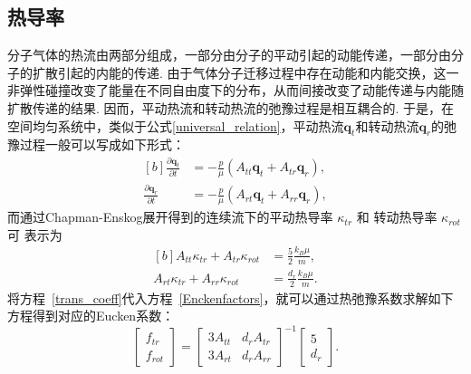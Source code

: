 \subsection{热导率} 

分子气体的热流由两部分组成，一部分由分子的平动引起的动能传递，一部分由分子的扩散引起的内能的传递. 由于气体分子迁移过程中存在动能和内能交换，这一非弹性碰撞改变了能量在不同自由度下的分布，从而间接改变了动能传递与内能随扩散传递的结果. 因而，平动热流和转动热流的弛豫过程是相互耦合的.  于是，在空间均匀系统中，类似于公式\eqref{universal_relation}，平动热流$\bm{q}_{t}$和转动热流$\bm{q}_{r}$的弛豫过程一般可以写成如下形式：
\begin{equation}\label{relax_flux}
\begin{aligned}[b]
\frac{\partial\bm{q}_{t}}{\partial{t}}&=-\frac{p}{\mu}( A_{tt}\bm{q}_{t}+A_{tr}\bm{q}_{r}),\\
\frac{\partial\bm{q}_{r}}{\partial{t}}&=-\frac{p}{\mu}( A_{rt}\bm{q}_{t}+A_{rr}\bm{q}_{r}),
\end{aligned}
\end{equation}
而通过Chapman-Enskog展开得到的连续流下的平动热导率 $\kappa_{tr}$ 和 转动热导率 $\kappa_{rot}$ 可 表示为
\begin{equation}\label{trans_coeff}
\begin{aligned}[b]
A_{tt}\kappa_{tr}+A_{tr}\kappa_{rot}&=\frac{5}{2}\frac{k_B\mu}{m},\\
A_{rt}\kappa_{tr}+A_{rr}\kappa_{rot}&=\frac{d_r}{2}\frac{k_B\mu}{m}.
\end{aligned}
\end{equation}
将方程~\eqref{trans_coeff}代入方程~\eqref{Enckenfactors}，就可以通过热弛豫系数求解如下方程得到对应的Eucken系数：
\begin{equation}\label{f_trf_rot}
\begin{bmatrix}
f_{tr} \\ f_{rot}
\end{bmatrix}=
{\begin{bmatrix}
	3A_{tt} & d_rA_{tr} \\ 3A_{rt} & d_rA_{rr}
	\end{bmatrix}}^{-1}
\begin{bmatrix}
5 \\ d_r
\end{bmatrix}.
\end{equation}




